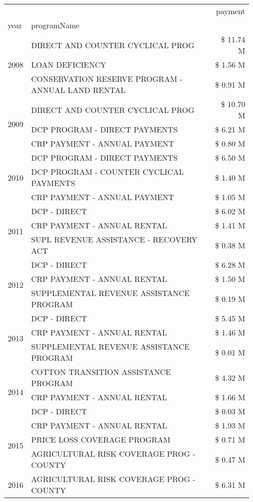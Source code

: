 \begin{tabular}{llr}
\toprule
 &  & payment \\
year & programName &  \\
\midrule
\multirow[t]{3}{*}{2008} & DIRECT AND COUNTER CYCLICAL PROG & \$ 11.74 M \\
 & LOAN DEFICIENCY & \$ 1.56 M \\
 & CONSERVATION RESERVE PROGRAM - ANNUAL LAND RENTAL & \$ 0.91 M \\
\cline{1-3}
\multirow[t]{3}{*}{2009} & DIRECT AND COUNTER CYCLICAL PROG & \$ 10.70 M \\
 & DCP PROGRAM - DIRECT PAYMENTS & \$ 6.21 M \\
 & CRP PAYMENT - ANNUAL PAYMENT & \$ 0.80 M \\
\cline{1-3}
\multirow[t]{3}{*}{2010} & DCP PROGRAM - DIRECT PAYMENTS & \$ 6.50 M \\
 & DCP PROGRAM - COUNTER CYCLICAL PAYMENTS & \$ 1.40 M \\
 & CRP PAYMENT - ANNUAL PAYMENT & \$ 1.05 M \\
\cline{1-3}
\multirow[t]{3}{*}{2011} & DCP - DIRECT & \$ 6.02 M \\
 & CRP PAYMENT - ANNUAL RENTAL & \$ 1.41 M \\
 & SUPL REVENUE ASSISTANCE - RECOVERY ACT & \$ 0.38 M \\
\cline{1-3}
\multirow[t]{3}{*}{2012} & DCP - DIRECT & \$ 6.28 M \\
 & CRP PAYMENT - ANNUAL RENTAL & \$ 1.50 M \\
 & SUPPLEMENTAL REVENUE ASSISTANCE PROGRAM & \$ 0.19 M \\
\cline{1-3}
\multirow[t]{3}{*}{2013} & DCP - DIRECT & \$ 5.45 M \\
 & CRP PAYMENT - ANNUAL RENTAL & \$ 1.46 M \\
 & SUPPLEMENTAL REVENUE ASSISTANCE PROGRAM & \$ 0.01 M \\
\cline{1-3}
\multirow[t]{3}{*}{2014} & COTTON TRANSITION ASSISTANCE PROGRAM & \$ 4.32 M \\
 & CRP PAYMENT - ANNUAL RENTAL & \$ 1.66 M \\
 & DCP - DIRECT & \$ 0.03 M \\
\cline{1-3}
\multirow[t]{3}{*}{2015} & CRP PAYMENT - ANNUAL RENTAL & \$ 1.93 M \\
 & PRICE LOSS COVERAGE PROGRAM & \$ 0.71 M \\
 & AGRICULTURAL RISK COVERAGE PROG - COUNTY & \$ 0.47 M \\
\cline{1-3}
\multirow[t]{3}{*}{2016} & AGRICULTURAL RISK COVERAGE PROG - COUNTY & \$ 6.31 M \\

\end{tabular}
